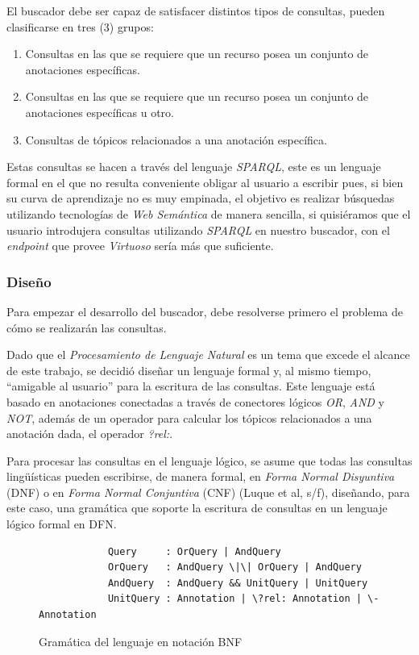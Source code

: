 \begin{itemize}
El buscador debe ser capaz de satisfacer distintos tipos de consultas, pueden clasificarse en tres (3) grupos:

\begin{enumerate}
    \item Consultas en las que se requiere que un recurso posea un conjunto de anotaciones específicas.
    \item Consultas en las que se requiere que un recurso posea un conjunto de anotaciones específicas u otro.
    \item Consultas de tópicos relacionados a una anotación específica.
\end{enumerate}

Estas consultas se hacen a través del lenguaje \textit{SPARQL}, este es un lenguaje formal en el que no resulta conveniente obligar al usuario a escribir pues, si bien su curva de aprendizaje no es muy empinada, el objetivo es realizar búsquedas utilizando tecnologías de \textit{Web Semántica} de manera sencilla, si quisiéramos que el usuario introdujera consultas utilizando \textit{SPARQL} en nuestro buscador, con el \textit{endpoint} que provee \textit{Virtuoso} sería más que suficiente.

\subsubsection{Diseño}
Para empezar el desarrollo del buscador, debe resolverse primero el problema de cómo se realizarán las consultas.

Dado que el \textit{Procesamiento de Lenguaje Natural} es un tema que excede el alcance de este trabajo, se decidió diseñar un lenguaje formal y, al mismo tiempo, ``amigable al usuario'' para la escritura de las consultas. Este lenguaje está basado en anotaciones conectadas a través de conectores lógicos \textit{OR}, \textit{AND} y \textit{NOT}, además de un operador para calcular los tópicos relacionados a una anotación dada, el operador \textit{?rel:}.

Para procesar las consultas en el lenguaje lógico, se asume que todas las consultas lingüísticas pueden escribirse, de manera formal, en \textit{Forma Normal Disyuntiva} (DNF) o en \textit{Forma Normal Conjuntiva} (CNF) (Luque et al, s/f), diseñando, para este caso, una gramática que soporte la escritura de consultas en un lenguaje lógico formal en DFN.

\begin{figure}[!h]
    \begin{center}
        \begin{verbatim} 
            Query     : OrQuery | AndQuery
            OrQuery   : AndQuery \|\| OrQuery | AndQuery
            AndQuery  : AndQuery && UnitQuery | UnitQuery
            UnitQuery : Annotation | \?rel: Annotation | \- Annotation
        \end{verbatim}
        \caption{Gramática del lenguaje en notación BNF}
        \label{BNFGrammar}
    \end{center}
\end{figure}


\end{itemize}
